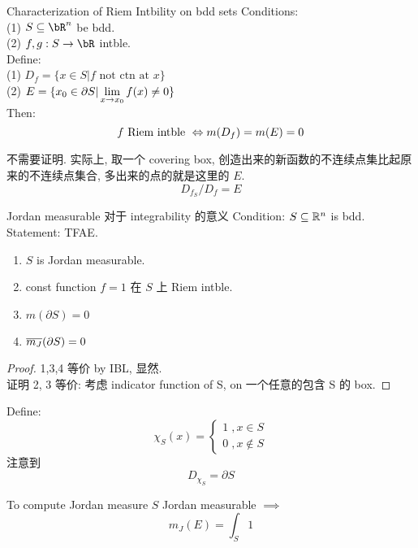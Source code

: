 \documentclass[lang=cn,11pt]{elegantbook}
\begin{document}
\begin{theorem}{Characterization of Riem Intbility on bdd sets}\label{Characterization of Riem Intbility on bdd sets}
    Conditions:\\
    (1) $S \sub \bR^n$ be bdd.\\
    (2) $f,g: S\rar \bR$ intble.\\
    Define:\\
    (1) $D_f = \{x \in S | f \text{ not ctn at } x\}$\\
    (2) $E = \{ x_0 \in \partial S  | \displaystyle \lim_{x \rightarrow x_0} f(x) \not = 0 \}$
    \\Then:
    $$
    f \text{ Riem intble } \displaystyle\Leftrightarrow m(D_f) = m(E) = 0
    $$
\end{theorem}
\begin{remark}
    不需要证明. 实际上, 取一个 covering box, 创造出来的新函数的不连续点集比起原来的不连续点集合, 多出来的点的就是这里的 $E$.
    $$
    D_{f_S} \slash D_f = E
    $$
\end{remark}


\begin{theorem}{Jordan measurable 对于 integrability 的意义} \label{equivalent conditions for Jordan-mesurability}
    Condition: $S \subseteq \mathbb{R}^n $ is bdd.\\
    Statement: TFAE.
    \begin{enumerate}
        \item $S$ is Jordan measurable.
        \item const function $f = 1$ 在 $S$ 上 Riem intble.
        \item  $m(\partial S) = 0$
        \item  $\overline{m_J}(\partial S) = 0 $
    \end{enumerate}
\end{theorem}
\begin{proof}
    1,3,4 等价 by IBL, 显然.\\
    证明 2, 3 等价: 考虑 indicator function of S, on 一个任意的包含 S 的 box.
\end{proof}

\begin{remark}
Define: 
$$
\chi_S (x) = \begin{cases}
    1 \; , x \in S \\
    0 \; , x \not\in S
\end{cases}
$$
注意到
$$
D_{\chi_S} = \partial S
$$
\end{remark}


\begin{corollary}{To compute Jordan measure}
    $S$ Jordan measurable $\implies$ 
    $$
    m_J (E) = \int_S 1 
    $$
\end{corollary}
\end{document}
